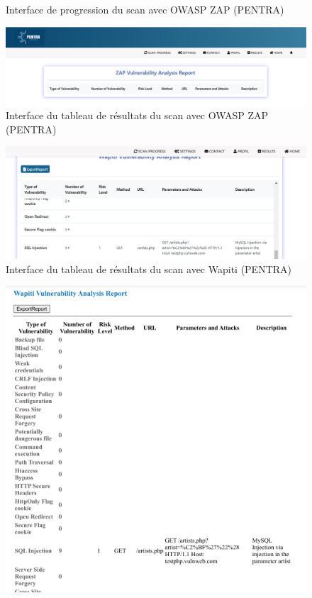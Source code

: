 \begin{justify}
\begin{enumerate}
\begin{figure}[H]
            \caption{\centering Interface de progression du scan avec OWASP ZAP (PENTRA)}
            \label{fig:PENTRA-V1-6}
        \end{figure}
        \vspace{-0.3cm}
        \begin{figure}[H]
            \centering
            \includegraphics[width=0.8\linewidth]{Annexe/PENTRA-V1/7.PNG}
            \caption{\centering Interface du tableau de résultats du scan avec OWASP ZAP (PENTRA)}
            \label{fig:PENTRA-V1-7}
        \end{figure}
        \vspace{-0.3cm}
        \begin{figure}[H]
            \centering
            \includegraphics[width=0.8\linewidth]{Annexe/PENTRA-V1/8.PNG}
            \caption{\centering Interface du tableau de résultats du scan avec Wapiti (PENTRA)}
            \label{fig:PENTRA-V1-8}
        \end{figure}
        \vspace{-0.8cm}
        \begin{figure}[H]
            \centering
            \includegraphics[width=0.8\linewidth]{Annexe/PENTRA-V1/9.PNG}

\end{figure}
\end{enumerate}
\end{justify}
